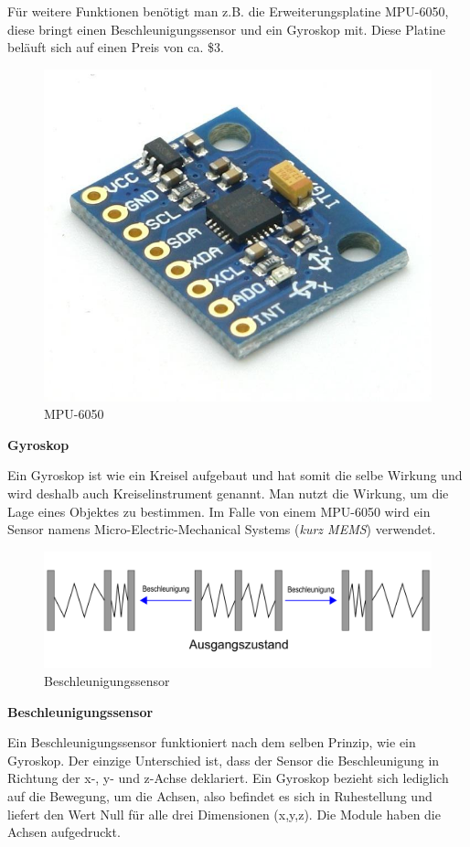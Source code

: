 Für weitere Funktionen benötigt man z.B. die Erweiterungsplatine MPU-6050, diese bringt einen Beschleunigungssensor und ein Gyroskop mit. Diese Platine beläuft sich auf einen Preis von ca. \$3.

\begin{figure}[H]
	\centering
	\includegraphics[width=0.7\linewidth]{images/MPU6050.jpg}
	\caption[MPU6050]{MPU-6050}
	\label{fig:MPU6050}
\end{figure}

\newpage
\textbf{Gyroskop}

Ein Gyroskop ist wie ein Kreisel aufgebaut und hat somit die selbe Wirkung und wird deshalb auch Kreiselinstrument genannt. Man nutzt die Wirkung, um die Lage eines Objektes zu bestimmen. Im Falle von einem MPU-6050 wird ein Sensor namens Micro-Electric-Mechanical Systems (\textit{kurz MEMS}) verwendet. 


\begin{figure}[H]
	\centering
	\includegraphics[width=0.7\linewidth]{images/Beschleunigungssensor.png}
	\caption[Beschleunigungssensor]{Beschleunigungssensor}
	\label{fig:Beschleunigungssensor}
\end{figure}

\textbf{Beschleunigungssensor}

Ein Beschleunigungssensor funktioniert nach dem selben Prinzip, wie ein Gyroskop. Der einzige Unterschied ist, dass der Sensor die Beschleunigung in Richtung der x-, y- und z-Achse deklariert. Ein Gyroskop bezieht sich lediglich auf die Bewegung, um die Achsen, also befindet es sich in Ruhestellung und liefert den Wert Null für alle drei Dimensionen (x,y,z). \textcite{MPU6050} Die Module haben die Achsen aufgedruckt.

